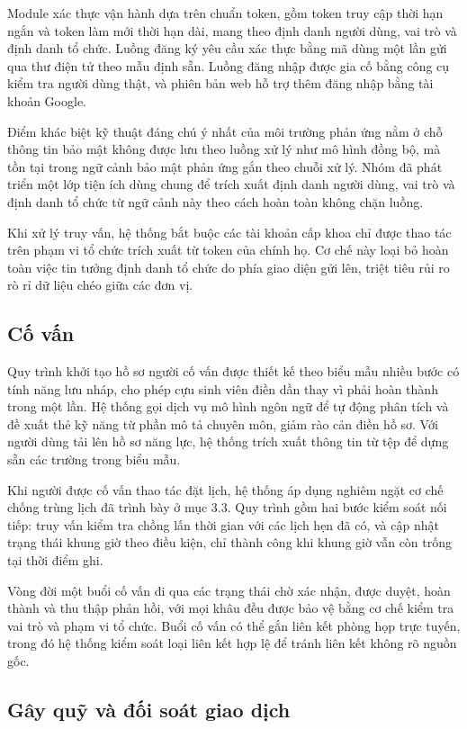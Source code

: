 \documentclass[12pt,a4paper,oneside]{report}
\begin{document}
Module xác thực vận hành dựa trên chuẩn token, gồm token truy cập thời hạn ngắn và token làm mới thời hạn dài, mang theo định danh người dùng, vai trò và định danh tổ chức. Luồng đăng ký yêu cầu xác thực bằng mã dùng một lần gửi qua thư điện tử theo mẫu định sẵn. Luồng đăng nhập được gia cố bằng công cụ kiểm tra người dùng thật, và phiên bản web hỗ trợ thêm đăng nhập bằng tài khoản Google.

Điểm khác biệt kỹ thuật đáng chú ý nhất của môi trường phản ứng nằm ở chỗ thông tin bảo mật không được lưu theo luồng xử lý như mô hình đồng bộ, mà tồn tại trong ngữ cảnh bảo mật phản ứng gắn theo chuỗi xử lý. Nhóm đã phát triển một lớp tiện ích dùng chung để trích xuất định danh người dùng, vai trò và định danh tổ chức từ ngữ cảnh này theo cách hoàn toàn không chặn luồng.

Khi xử lý truy vấn, hệ thống bắt buộc các tài khoản cấp khoa chỉ được thao tác trên phạm vi tổ chức trích xuất từ token của chính họ. Cơ chế này loại bỏ hoàn toàn việc tin tưởng định danh tổ chức do phía giao diện gửi lên, triệt tiêu rủi ro rò rỉ dữ liệu chéo giữa các đơn vị.

\subsection{Cố vấn}

Quy trình khởi tạo hồ sơ người cố vấn được thiết kế theo biểu mẫu nhiều bước có tính năng lưu nháp, cho phép cựu sinh viên điền dần thay vì phải hoàn thành trong một lần. Hệ thống gọi dịch vụ mô hình ngôn ngữ để tự động phân tích và đề xuất thẻ kỹ năng từ phần mô tả chuyên môn, giảm rào cản điền hồ sơ. Với người dùng tải lên hồ sơ năng lực, hệ thống trích xuất thông tin từ tệp để dựng sẵn các trường trong biểu mẫu.

Khi người được cố vấn thao tác đặt lịch, hệ thống áp dụng nghiêm ngặt cơ chế chống trùng lịch đã trình bày ở mục 3.3. Quy trình gồm hai bước kiểm soát nối tiếp: truy vấn kiểm tra chồng lấn thời gian với các lịch hẹn đã có, và cập nhật trạng thái khung giờ theo điều kiện, chỉ thành công khi khung giờ vẫn còn trống tại thời điểm ghi.

Vòng đời một buổi cố vấn đi qua các trạng thái chờ xác nhận, được duyệt, hoàn thành và thu thập phản hồi, với mọi khâu đều được bảo vệ bằng cơ chế kiểm tra vai trò và phạm vi tổ chức. Buổi cố vấn có thể gắn liên kết phòng họp trực tuyến, trong đó hệ thống kiểm soát loại liên kết hợp lệ để tránh liên kết không rõ nguồn gốc.

\subsection{Gây quỹ và đối soát giao dịch}
\end{document}
